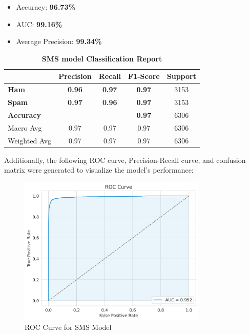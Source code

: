 \documentclass{article}
\begin{document}
\begin{itemize}
    \item Accuracy: \textbf{96.73\%}
    \item AUC: \textbf{99.16\%}
    \item Average Precision: \textbf{99.34\%}
\end{itemize}

\begin{table}[htbp]
    \centering
    \caption{\textbf{SMS model Classification Report}}
    \begin{tabular}{l c c c c}
    \toprule
     & \textbf{Precision} & \textbf{Recall} & \textbf{F1-Score} & Support \\
    \midrule
    \textbf{Ham} & \textbf{0.96} & \textbf{0.97} & \textbf{0.97} & 3153 \\
    \textbf{Spam} & \textbf{0.97} & \textbf{0.96} & \textbf{0.97} & 3153 \\
    \midrule
    \textbf{Accuracy} & & & \textbf{0.97} & 6306 \\
    Macro Avg & 0.97 & 0.97 & 0.97 & 6306 \\
    Weighted Avg & 0.97 & 0.97 & 0.97 & 6306 \\
    \bottomrule
    \end{tabular}
    \label{tab:classification_report_2}
\end{table}

\noindent
Additionally, the following ROC curve, Precision-Recall curve, and confusion matrix were generated to visualize the model's performance:

\begin{figure}[htbp]
    \centering
    \includegraphics[width=0.8\textwidth]{../analysis/sms/randomforest/roc_curve.png}
    \caption{ROC Curve for SMS Model}
    \label{fig:roc_curve_2}
\end{figure}
\end{document}
